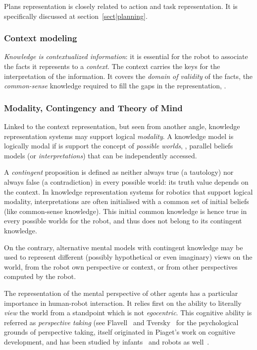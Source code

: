 Plans representation is closely related to action and task representation. It
is specifically discussed at section~\ref{sect|planning}.

\subsubsection{Context modeling}

\emph{Knowledge is contextualized information}: it is essential for the robot to associate the facts it
represents to a \emph{context}. The context carries the keys for the
interpretation of the information. It covers the \emph{domain of validity} of
the facts, the \emph{common-sense} knowledge required to fill the gaps in the
representation, .


\subsubsection{Modality, Contingency and Theory of Mind}
\label{sect|possible-worlds}

Linked to the context representation, but seen from another angle, knowledge
representation systems may support logical \emph{modality}. A knowledge model
is logically modal if is support the concept of \emph{possible worlds}, \ie,
parallel beliefs models (or \emph{interpretations}) that can be independently
accessed.

A \emph{contingent} proposition is defined as neither always true (a tautology)
nor always false (a contradiction) in every possible world: its truth value
depends on the context. In knowledge representation systems for robotics that
support logical modality, interpretations are often initialised with a common
set of initial beliefs (like common-sense knowledge). This initial common
knowledge is hence true in every possible worlds for the robot, and thus does
not belong to its contingent knowledge.

On the contrary, alternative mental models with contingent knowledge may be
used to represent different (possibly hypothetical or even imaginary) views on
the world, from the robot own perspective or context, or from other
perspectives computed by the robot.

The representation of the mental perspective of other agents has a particular
importance in human-robot interaction. It relies first on the ability to
literally \emph{view} the world from a standpoint which is not
\emph{egocentric}. This cognitive ability is referred as \emph{perspective
taking} (see Flavell~\cite{Flavell1992} and Tversky~\cite{Tversky1999} for the
psychological grounds of perspective taking, itself originated in Piaget's work
on cognitive development, and has been studied by infants~\cite{Moll2006} and
robots as well~\cite{Trafton2005, Breazeal2006, Ros2010}.

